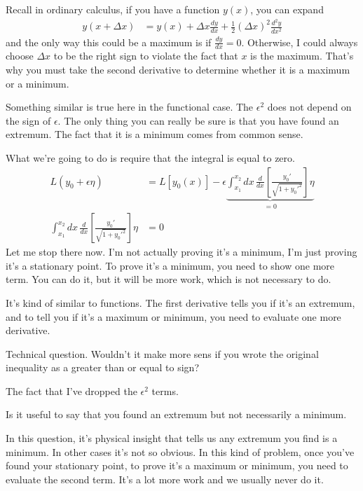 Recall in ordinary calculus,
if you have a function $y(x)$,
you can expand
\begin{align}
    y(x + \Delta x) &=
    y(x) + \Delta x \frac{dy}{dx}
    + \frac{1}{2}\left( \Delta x \right)^2 \frac{d^2y}{dx^2}
\end{align}
and the only way this could be a maximum is if
$\frac{dy}{dx}=0$.
Otherwise, I could always choose $\Delta x$ to be the right sign
to violate the fact that $x$ is the maximum.
That's why you must take the second derivative to determine whether it is a
maximum or a minimum.

Something similar is true here in the functional case.
The $\epsilon^2$ does not depend on the sign of $\epsilon$.
The only thing you can really be sure is that you have found an extremum.
The fact that it is a minimum comes from common sense.

What we're going to do is require that the integral is equal to zero.
\begin{align}
    L\left( y_0 + \epsilon \eta \right) &=
    L[y_0(x)]
    -
    \epsilon
    \underbrace{
        \int_{x_1}^{x_2} dx\,
        \frac{d}{dx}\left[ 
        \frac{y_0'}{\sqrt{1 + y_0'^2}}
        \right]\eta
    }_{=0}\\
    \int_{x_1}^{x_2} dx\,
    \frac{d}{dx}\left[ 
    \frac{y_0'}{\sqrt{1 + y_0'^2}}
    \right]\eta
    &= 0
\end{align}
Let me stop there now.
I'm not actually proving it's a minimum,
I'm just proving it's a stationary point.
To prove it's a minimum,
you need to show one more term.
You can do it,
but it will be more work,
which is not necessary to do.

It's kind of similar to functions.
The first derivative tells you if it's an extremum,
and to tell you if it's a maximum or minimum,
you need to evaluate one more derivative.

\begin{question}
    Technical question.
    Wouldn't it make more sens if you wrote the original inequality
    as a greater than or equal to sign?
\end{question}
The fact that I've dropped the $\epsilon^2$ terms.

\begin{question}
    Is it useful to say that you found an extremum but not necessarily a
    minimum.
\end{question}
In this question,
it's physical insight that tells us any extremum you find is a minimum.
In other cases it's not so obvious.
In this kind of problem,
once you've found your stationary point,
to prove it's a maximum or minimum,
you need to evaluate the second term.
It's a lot more work and we usually never do it.

